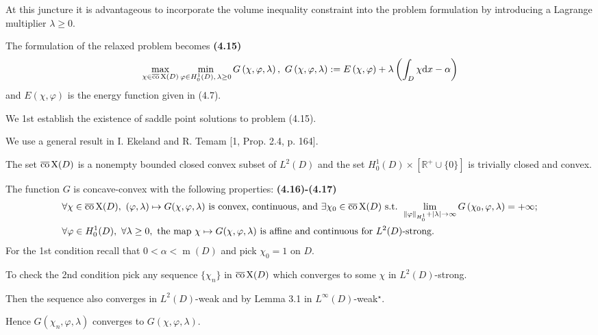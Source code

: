 \documentclass{book}
\numberwithin{equation}{section}
\begin{document}
\begin{enumerate}
    At this juncture it is advantageous to incorporate the volume inequality constraint into the problem formulation by introducing a Lagrange multiplier $\lambda\ge 0$.
    
    The formulation of the relaxed problem becomes \textbf{(4.15)}
    \begin{align*}
        \max_{\chi\in\overline{\rm co}\operatorname{X}(D)} \min_{\varphi\in H_0^1(D),\,\lambda\ge 0} G\left(\chi,\varphi,\lambda\right),\ G\left(\chi,\varphi,\lambda\right) := E\left(\chi,\varphi\right) + \lambda\left(\int_D \chi{\rm d}x - \alpha\right)
    \end{align*}
    and $E(\chi,\varphi)$ is the energy function given in (4.7).
    
    We 1st establish the existence of saddle point solutions to problem (4.15).
    
    We use a general result in I. Ekeland and R. Temam [1, Prop. 2.4, p. 164].
    
    The set $\overline{\rm co}\operatorname{X}(D)$ is a nonempty bounded closed convex subset of $L^2(D)$ and the set $H_0^1(D)\times[\mathbb{R}^+\cup\{0\}]$ is trivially closed and convex.
    
    The function $G$ is concave-convex with the following properties: \textbf{(4.16)-(4.17)}
    \begin{align*}
        &\forall\chi\in\overline{\rm co}\operatorname{X}(D),\ (\varphi,\lambda)\mapsto G(\chi,\varphi,\lambda) \mbox{ is convex, continuous, and } \exists\chi_0\in\overline{\rm co}\operatorname{X}(D) \mbox{ s.t. } \lim_{\|\varphi\|_{H_0^1} + |\lambda|\to\infty} G\left(\chi_0,\varphi,\lambda\right) = +\infty;\\
        &\forall\varphi\in H_0^1(D),\ \forall\lambda\ge 0, \mbox{ the map } \chi\mapsto G(\chi,\varphi,\lambda) \mbox{ is affine and continuous for } L^2(D)\mbox{-strong}.
    \end{align*}
    For the 1st condition recall that $0 < \alpha < \operatorname{m}(D)$ and pick $\chi_0 = 1$ on $D$.
    
    To check the 2nd condition pick any sequence $\{\chi_n\}$ in $\overline{\rm co}\operatorname{X}(D)$ which converges to some $\chi$ in $L^2(D)$-strong.
    
    Then the sequence also converges in $L^2(D)$-weak and by Lemma 3.1 in $L^\infty(D)$-weak${}^\star$.
    
    Hence $G\left(\chi_n,\varphi,\lambda\right)$ converges to $G(\chi,\varphi,\lambda)$.
    

\end{enumerate}
\end{document}
